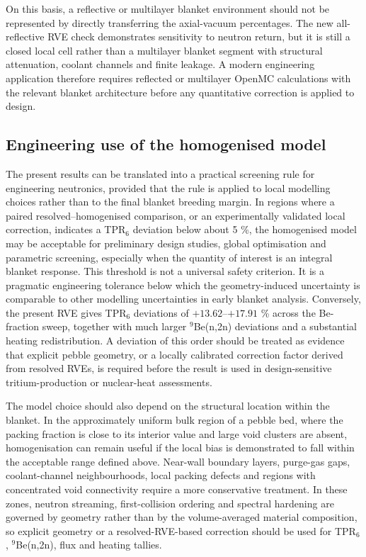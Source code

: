 \documentclass[preprint,12pt]{elsarticle}
\begin{document}
On this basis, a reflective or multilayer blanket environment should not be
represented by directly transferring the axial-vacuum percentages.  The new
all-reflective RVE check demonstrates sensitivity to neutron return, but it is
still a closed local cell rather than a multilayer blanket segment with
structural attenuation, coolant channels and finite leakage.  A modern
engineering application therefore requires reflected or multilayer OpenMC
calculations with the relevant blanket architecture before any quantitative
correction is applied to design.

\subsection{Engineering use of the homogenised model}

The present results can be translated into a practical screening rule for
engineering neutronics, provided that the rule is applied to local modelling
choices rather than to the final blanket breeding margin.  In regions where a
paired resolved--homogenised comparison, or an experimentally validated local
correction, indicates a TPR$_6$ deviation below about 5 \%, the homogenised model
may be acceptable for preliminary design studies, global optimisation and
parametric screening, especially when the quantity of interest is an
integral blanket response.  This threshold is not a universal safety criterion.
It is a pragmatic engineering tolerance below which the geometry-induced
uncertainty is comparable to other modelling uncertainties in early blanket
analysis.  Conversely, the present RVE gives TPR$_6$ deviations of
$+13.62$--$+17.91$ \% across the Be-fraction sweep, together with much larger
$^9$Be(n,2n) deviations and a substantial heating redistribution.  A deviation
of this order should be treated as evidence that explicit pebble geometry, or a
locally calibrated correction factor derived from resolved RVEs, is required
before the result is used in design-sensitive tritium-production or nuclear-heat
assessments.

The model choice should also depend on the structural location within the
blanket.  In the approximately uniform bulk region of a pebble bed, where the
packing fraction is close to its interior value and large void clusters are
absent, homogenisation can remain useful if the local bias is demonstrated to
fall within the acceptable range defined above.  Near-wall boundary layers,
purge-gas gaps, coolant-channel neighbourhoods, local packing defects and
regions with concentrated void connectivity require a more conservative
treatment.  In these zones, neutron streaming, first-collision ordering and
spectral hardening are governed by geometry rather than by the volume-averaged
material composition, so explicit geometry or a resolved-RVE-based correction
should be used for TPR$_6$, $^9$Be(n,2n), flux and heating tallies.
\end{document}
